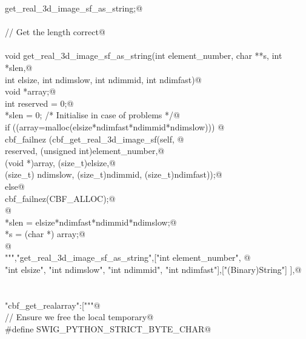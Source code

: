 \documentclass[10pt,a4paper,twoside,notitlepage]{article}
\begin{document}
\begin{flushleft}
\begin{list}{}{}
\mbox{}\verb@       get_real_3d_image_sf_as_string;@\\
\mbox{}\verb@@\\
\mbox{}\verb@// Get the length correct@\\
\mbox{}\verb@@\\
\mbox{}\verb@    void get_real_3d_image_sf_as_string(int element_number, char **s, int *slen,@\\
\mbox{}\verb@    int elsize, int ndimslow, int ndimmid, int ndimfast){@\\
\mbox{}\verb@        void *array;@\\
\mbox{}\verb@        int reserved = 0;@\\
\mbox{}\verb@        *slen = 0; /* Initialise in case of problems */@\\
\mbox{}\verb@        if ((array=malloc(elsize*ndimfast*ndimmid*ndimslow))) {@\\
\mbox{}\verb@               cbf_failnez (cbf_get_real_3d_image_sf(self, @\\
\mbox{}\verb@               reserved, (unsigned int)element_number,@\\
\mbox{}\verb@               (void *)array, (size_t)elsize,@\\
\mbox{}\verb@               (size_t) ndimslow, (size_t)ndimmid, (size_t)ndimfast));@\\
\mbox{}\verb@         }else{@\\
\mbox{}\verb@               cbf_failnez(CBF_ALLOC);@\\
\mbox{}\verb@         }@\\
\mbox{}\verb@        *slen = elsize*ndimfast*ndimmid*ndimslow;@\\
\mbox{}\verb@        *s = (char *) array;@\\
\mbox{}\verb@      }@\\
\mbox{}\verb@""","get_real_3d_image_sf_as_string",["int element_number", @\\
\mbox{}\verb@    "int elsize", "int ndimslow", "int ndimmid", "int ndimfast"],["(Binary)String"] ],@\\
\mbox{}\verb@@\\
\mbox{}\verb@@\\
\mbox{}\verb@"cbf_get_realarray":["""@\\
\mbox{}\verb@// Ensure we free the local temporary@\\
\mbox{}\verb@%{@\\
\mbox{}\verb@#define SWIG_PYTHON_STRICT_BYTE_CHAR@\\
\mbox{}\verb@%}@\\

\end{list}
\end{flushleft}
\end{document}
